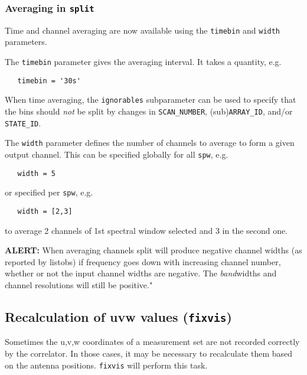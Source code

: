 {\subsubsection{Averaging in {\tt split}}
\label{section:cal.other.split.average}

Time and channel averaging are now available using the {\tt timebin}
and {\tt width} parameters.

The {\tt timebin} parameter gives the averaging interval.  It takes a
quantity, e.g.
\small
\begin{verbatim}
   timebin = '30s'
\end{verbatim}
\normalsize

When time averaging, the {\tt ignorables} subparameter can be used to
specify that the bins should \emph{not} be split by changes in
{\tt SCAN\_NUMBER}, (sub){\tt ARRAY\_ID}, and/or {\tt STATE\_ID}.


The {\tt width} parameter defines the number of channels to average to
form a given output channel.  This can be specified globally for all
{\tt spw}, e.g.

\small
\begin{verbatim}
   width = 5
\end{verbatim}
\normalsize

or specified per {\tt spw}, e.g.

\small
\begin{verbatim}
   width = [2,3]
\end{verbatim}
\normalsize

to average 2 channels of 1st spectral window selected and 3 in the 
second one.


{\bf ALERT:} When averaging channels split will produce negative channel widths
(as reported by listobs) if frequency goes down with increasing channel
number, whether or not the input channel widths are negative.  The
\emph{band}widths and channel resolutions will still be positive."


\subsection{Recalculation of uvw values ({\tt fixvis})}
\label{section:cal.other.fixvis}

Sometimes the u,v,w coordinates of a measurement set are not recorded
correctly by the correlator. In those cases, it may be necessary to
recalculate them based on the antenna positions. {\tt fixvis} will
perform this task.


}
